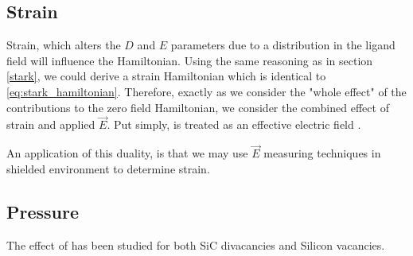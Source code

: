 \subsection{Strain}
Strain, which alters the $D$ and $E$ parameters due to a distribution in the ligand field \cite{Jeschke} will influence the Hamiltonian.
Using the same reasoning as
in section \ref{stark}, we could derive a strain Hamiltonian which is identical to \eqref{eq:stark_hamiltonian}.
Therefore, exactly as we consider the "whole effect" of the contributions to the zero field Hamiltonian, we consider
the combined effect of strain and applied $\vec{E}$. Put simply,  is treated as an effective electric
field \cite{PhysRevLett.112.187601}.

An application of this duality, is that we may use $\vec{E}$ measuring techniques in shielded environment to determine strain.



\subsection{Pressure}
The effect of  has been studied for both SiC divacancies and Silicon vacancies. 

